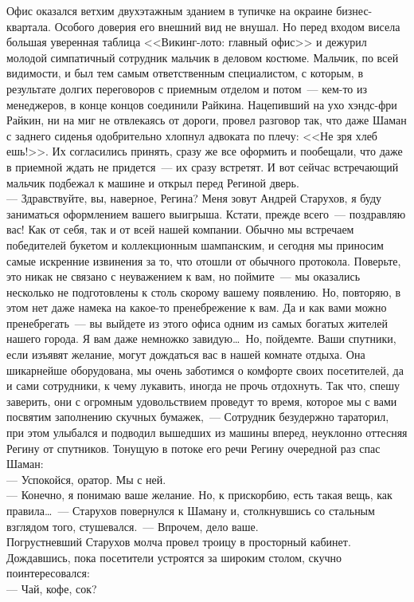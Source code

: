 Офис оказался ветхим двухэтажным зданием в тупичке на окраине бизнес-квартала. 
Особого доверия его внешний вид не внушал. Но перед входом висела большая 
уверенная таблица <<Викинг-лото: главный офис>> и дежурил молодой симпатичный 
сотрудник мальчик в деловом костюме. Мальчик, по всей видимости, и был тем 
самым ответственным специалистом, с которым, в результате долгих переговоров с 
приемным отделом и потом~--- кем-то из менеджеров, в конце концов соединили 
Райкина. Нацепивший на ухо хэндс-фри Райкин, ни на миг не отвлекаясь от дороги, 
провел разговор так, что даже Шаман с заднего сиденья одобрительно хлопнул 
адвоката по плечу: <<Не зря хлеб ешь!>>. Их согласились принять, сразу же все 
оформить и пообещали, что даже в приемной ждать не придется~--- их сразу 
встретят. И вот сейчас встречающий мальчик подбежал к машине и открыл перед Региной дверь.\\
--- Здравствуйте, вы, наверное, Регина? Меня зовут Андрей Старухов, я буду 
заниматься оформлением вашего выигрыша. Кстати, прежде всего~--- поздравляю 
вас! Как от себя, так и от всей нашей компании. Обычно мы встречаем победителей 
букетом и коллекционным шампанским, и сегодня мы приносим самые искренние 
извинения за то, что отошли от обычного протокола. Поверьте, это никак не 
связано с неуважением к вам, но поймите~--- мы оказались несколько не 
подготовлены к столь скорому вашему появлению. Но, повторяю, в этом нет даже намека на 
какое-то пренебрежение к вам. Да и как вами можно пренебрегать~--- вы выйдете 
из этого офиса одним из самых богатых жителей нашего города. Я вам даже немножко 
завидую\ldots\ Но, пойдемте. Ваши спутники, если изъявят желание, могут 
дождаться вас в нашей комнате отдыха. Она шикарнейше оборудована, мы очень заботимся о 
комфорте своих посетителей, да и сами сотрудники, к чему лукавить, иногда не 
прочь отдохнуть. Так что, спешу заверить, они с огромным удовольствием проведут 
то время, которое мы с вами посвятим заполнению скучных бумажек,~--- Сотрудник 
безудержно тараторил, при этом улыбался и подводил вышедших из машины вперед, 
неуклонно оттесняя Регину от спутников. Тонущую в потоке его речи Регину 
очередной раз спас Шаман:\\
--- Успокойся, оратор. Мы с ней.\\
--- Конечно, я понимаю ваше желание. Но, к прискорбию, есть такая вещь, как 
правила\ldots~--- Старухов повернулся к Шаману и, столкнувшись со стальным 
взглядом того, стушевался.~--- Впрочем, дело ваше.\\
Погрустневший Старухов молча провел троицу в просторный кабинет. Дождавшись, 
пока посетители устроятся за широким столом, скучно поинтересовался:\\
--- Чай, кофе, сок?

